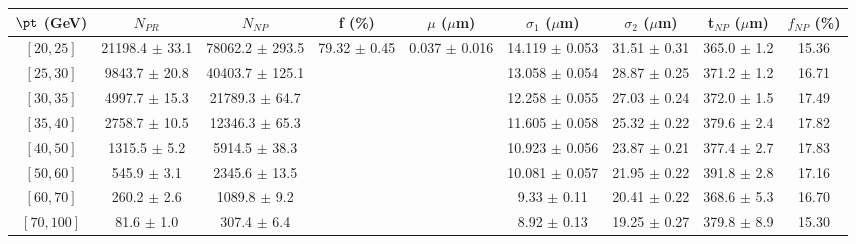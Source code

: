 \begin{tabular}{c||c|c|c|c|c|c|c||c}
$\pt$ (GeV) & $N_{PR}$ & $N_{NP}$ & f (\%) & $\mu$ ($\mu$m) & $\sigma_1$ ($\mu$m) & $\sigma_2$ ($\mu$m)  & t$_{NP}$ ($\mu$m) & $f_{NP}$ (\%) \\
\hline
$[20, 25]$ & 21198.4 $\pm$ 33.1 & 78062.2 $\pm$ 293.5 & \multirow{8}{*}{79.32 $\pm$ 0.45} & \multirow{8}{*}{0.037 $\pm$ 0.016} & 14.119 $\pm$ 0.053 & 31.51 $\pm$ 0.31 & 365.0 $\pm$ 1.2 & 15.36\\
$[25, 30]$ & 9843.7 $\pm$ 20.8 & 40403.7 $\pm$ 125.1 &  &  & 13.058 $\pm$ 0.054 & 28.87 $\pm$ 0.25 & 371.2 $\pm$ 1.2 & 16.71\\
$[30, 35]$ & 4997.7 $\pm$ 15.3 & 21789.3 $\pm$ 64.7 &  &  & 12.258 $\pm$ 0.055 & 27.03 $\pm$ 0.24 & 372.0 $\pm$ 1.5 & 17.49\\
$[35, 40]$ & 2758.7 $\pm$ 10.5 & 12346.3 $\pm$ 65.3 &  &  & 11.605 $\pm$ 0.058 & 25.32 $\pm$ 0.22 & 379.6 $\pm$ 2.4 & 17.82\\
$[40, 50]$ & 1315.5 $\pm$ 5.2 & 5914.5 $\pm$ 38.3 &  &  & 10.923 $\pm$ 0.056 & 23.87 $\pm$ 0.21 & 377.4 $\pm$ 2.7 & 17.83\\
$[50, 60]$ & 545.9 $\pm$ 3.1 & 2345.6 $\pm$ 13.5 &  &  & 10.081 $\pm$ 0.057 & 21.95 $\pm$ 0.22 & 391.8 $\pm$ 2.8 & 17.16\\
$[60, 70]$ & 260.2 $\pm$ 2.6 & 1089.8 $\pm$ 9.2 &  &  & 9.33 $\pm$ 0.11 & 20.41 $\pm$ 0.22 & 368.6 $\pm$ 5.3 & 16.70\\
$[70, 100]$ & 81.6 $\pm$ 1.0 & 307.4 $\pm$ 6.4 &  &  & 8.92 $\pm$ 0.13 & 19.25 $\pm$ 0.27 & 379.8 $\pm$ 8.9 & 15.30\\
\end{tabular}
